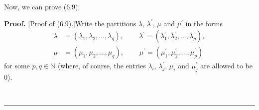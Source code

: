 \documentclass[numbers=enddot,12pt,final,onecolumn,notitlepage]{scrartcl}%
\theoremstyle{definition}
\newenvironment{proof}[1][Proof]{\noindent\textbf{#1.} }{\ \rule{0.5em}{0.5em}}
\begin{document}
\begin{enumerate}
Now, we can prove (6.9):

\begin{proof}
[Proof of (6.9).]Write the partitions $\lambda$, $\lambda^{\prime}$, $\mu$ and
$\mu^{\prime}$ in the forms%
\begin{align*}
\lambda &  =\left(  \lambda_{1},\lambda_{2},\ldots,\lambda_{q}\right)
,\ \ \ \ \ \ \ \ \ \ \lambda^{\prime}=\left(  \lambda_{1}^{\prime},\lambda
_{2}^{\prime},\ldots,\lambda_{p}^{\prime}\right)  ,\\
\mu &  =\left(  \mu_{1},\mu_{2},\ldots,\mu_{q}\right)
,\ \ \ \ \ \ \ \ \ \ \mu^{\prime}=\left(  \mu_{1}^{\prime},\mu_{2}^{\prime
},\ldots,\mu_{p}^{\prime}\right)
\end{align*}
for some $p,q\in\mathbb{N}$ (where, of course, the entries $\lambda_{i}$,
$\lambda_{j}^{\prime}$, $\mu_{i}$ and $\mu_{j}^{\prime}$ are allowed to be $0$).


\end{proof}
\end{enumerate}
\end{document}
